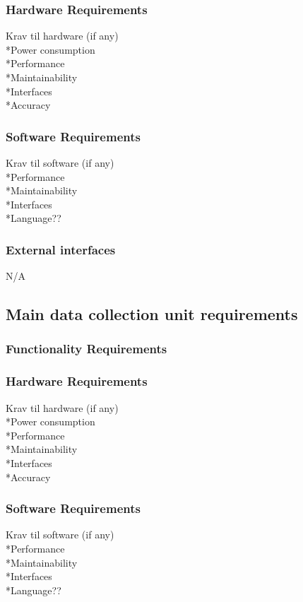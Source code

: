 \subsubsection{Hardware Requirements}
Krav til hardware (if any)\\
*Power consumption\\
*Performance\\
*Maintainability\\
*Interfaces\\
*Accuracy\\
\subsubsection{Software Requirements}
Krav til software (if any)\\
*Performance\\
*Maintainability\\
*Interfaces\\
*Language??\\

\subsubsection{External interfaces}
N/A
\subsection{Main data collection unit requirements}

\subsubsection{Functionality Requirements}

\subsubsection{Hardware Requirements}
Krav til hardware (if any)\\
*Power consumption\\
*Performance\\
*Maintainability\\
*Interfaces\\
*Accuracy\\

\subsubsection{Software Requirements}
Krav til software (if any)\\
*Performance\\
*Maintainability\\
*Interfaces\\
*Language??\\

